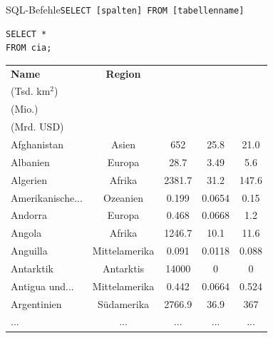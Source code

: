 \begin{frame}[fragile]{SQL-Befehle}{\lstinline|SELECT [spalten] FROM [tabellenname]|}
  \begin{lstlisting}
SELECT *
FROM cia;
\end{lstlisting}

  \begin{table}
    \centering
    \tiny
    \begin{tabular}{lcccc}
      \toprule
      \textbf{Name}    & \textbf{Region} & \makecell{\textbf{Fläche}\\(Tsd. km$^2$)} & \makecell{\textbf{Einwohner}\\(Mio.)} & \makecell{\textbf{BIP}\\(Mrd. USD)} \\
      \midrule
      Afghanistan      & Asien           & 652             & 25.8               & 21.0         \\
      Albanien         & Europa          & 28.7            & 3.49               & 5.6          \\
      Algerien         & Afrika          & 2381.7          & 31.2               & 147.6        \\
      Amerikanische... & Ozeanien        & 0.199           & 0.0654             & 0.15         \\
      Andorra          & Europa          & 0.468           & 0.0668             & 1.2          \\
      Angola           & Afrika          & 1246.7          & 10.1               & 11.6         \\
      Anguilla         & Mittelamerika   & 0.091           & 0.0118             & 0.088        \\
      Antarktik        & Antarktis       & 14000           & 0                  & 0            \\
      Antigua und...   & Mittelamerika   & 0.442           & 0.0664             & 0.524        \\
      Argentinien      & Südamerika      & 2766.9          & 36.9               & 367          \\
      \midrule
      ...              & ...             & ...             & ...                & ...          \\
      \bottomrule
    \end{tabular}
  \end{table}
\end{frame}

